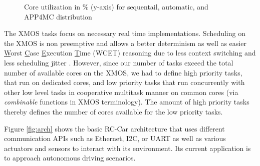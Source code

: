 \documentclass [a4paper,final,conference,10pt]{IDAACS}
\begin{document}
\begin{figure}[t!]
	\vspace{-10pt}
	\caption{Core utilization in \% (y-axis) for sequentail, automatic, and APP4MC distribution}
	\label{fig:dischart}
\end{figure}
The XMOS tasks focus on necessary real time implementations. Scheduling on the XMOS is non preemptive and allows a better determinism as well as easier \underline{W}orst \underline{C}ase \underline{E}xecution \underline{T}ime (WCET) reasoning due to less context switching and less scheduling jitter \cite{xmos}. However, since our number of tasks exceed the total number of available cores on the XMOS, we had to define high priority tasks, that run on dedicated cores, and low priority tasks that run concurrently with other low level tasks in cooperative multitask manner on common cores (via \textit{combinable} functions in XMOS terminology). The amount of high priority tasks thereby defines the number of cores available for the low priority tasks. 

Figure \ref{fig:arch} shows the basic RC-Car architecture that uses different communication APIs such as Ethernet, I2C, or UART as well as various actuators and sensors to interact with its environment. Its current application is to approach autonomous driving scenarios.


\end{document}
